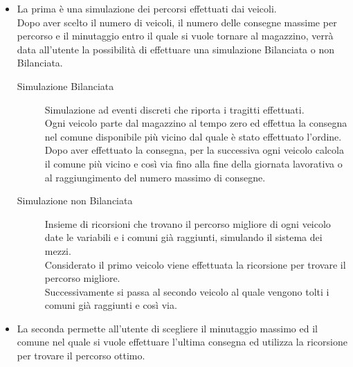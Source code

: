 \documentclass[a4paper,12pt]{report}
\begin{document}
\begin{itemize}
\item La prima è una simulazione dei percorsi effettuati dai veicoli.\\
Dopo aver scelto il numero di veicoli, il numero delle consegne massime per percorso e il minutaggio entro il quale si vuole tornare al magazzino, verrà data all'utente la possibilità di effettuare una simulazione Bilanciata o non Bilanciata.\\
\begin{description}
\item[Simulazione Bilanciata] Simulazione ad eventi discreti che riporta i tragitti effettuati.\\
Ogni veicolo parte dal magazzino al tempo zero ed effettua la consegna nel comune disponibile più vicino dal quale è stato effettuato l'ordine.\\
Dopo aver effettuato la consegna, per la successiva ogni veicolo calcola il comune più vicino e così via fino alla fine della giornata lavorativa o al raggiungimento del numero massimo di consegne.
\item[Simulazione non Bilanciata] Insieme di ricorsioni che trovano il percorso migliore di ogni veicolo date le variabili e i comuni già raggiunti, simulando il sistema dei mezzi.\\
Considerato il primo veicolo viene effettuata la ricorsione per trovare il percorso migliore.\\
Successivamente si passa al secondo veicolo al quale vengono tolti i comuni già raggiunti e così via.
\end{description}
\item La seconda permette all'utente di scegliere il minutaggio massimo ed il comune nel quale si vuole effettuare l'ultima consegna ed utilizza la ricorsione per trovare il percorso ottimo.\\
\end{itemize}
\end{document}
